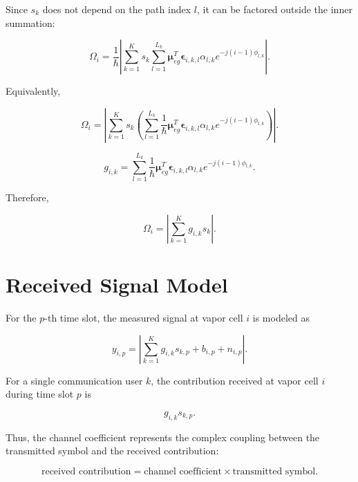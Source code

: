 \documentclass[12pt,a4paper]{article}
\begin{document}
Since $s_k$ does not depend on the path index $l$, it can be factored outside the inner summation:

\begin{equation}
\Omega_i
=
\frac{1}{\hbar}
\left|
\sum_{k=1}^{K}
 s_k
\sum_{l=1}^{L_k}
\boldsymbol{\mu}_{eg}^{T}
\boldsymbol{\epsilon}_{i,k,l}
\alpha_{l,k}
 e^{-j(i-1)\phi_{l,k}}
\right|.
\tag{73}
\end{equation}

Equivalently,

\begin{equation}
\Omega_i
=
\left|
\sum_{k=1}^{K}
 s_k
\left(
\sum_{l=1}^{L_k}
\frac{1}{\hbar}
\boldsymbol{\mu}_{eg}^{T}
\boldsymbol{\epsilon}_{i,k,l}
\alpha_{l,k}
 e^{-j(i-1)\phi_{l,k}}
\right)
\right|.
\tag{74}
\end{equation}

\begin{equation}
\boxed{
g_{i,k}
=
\sum_{l=1}^{L_k}
\frac{1}{\hbar}
\boldsymbol{\mu}_{eg}^{T}
\boldsymbol{\epsilon}_{i,k,l}
\alpha_{l,k}
e^{-j(i-1)\phi_{l,k}}
}.
\tag{75}
\end{equation}

Therefore,

\begin{equation}
\boxed{
\Omega_i
=
\left|
\sum_{k=1}^{K}
g_{i,k}s_k
\right|
}.
\tag{76}
\end{equation}

\section{Received Signal Model}

For the $p$-th time slot, the measured signal at vapor cell $i$ is modeled as

\begin{equation}
\boxed{
y_{i,p}
=
\left|
\sum_{k=1}^{K}
g_{i,k}s_{k,p}
+
b_{i,p}
+
n_{i,p}
\right|
}.
\tag{77}
\end{equation}

For a single communication user $k$, the contribution received at vapor cell $i$ during time slot $p$ is

\begin{equation}
g_{i,k}s_{k,p}.
\tag{78}
\end{equation}

Thus, the channel coefficient represents the complex coupling between the transmitted symbol and the received contribution:

\begin{equation}
\text{received contribution}
=
\text{channel coefficient}
\times
\text{transmitted symbol}.
\tag{79}
\end{equation}
\end{document}

